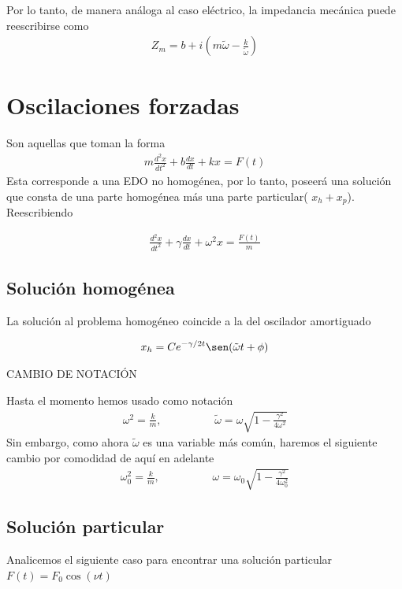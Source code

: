 \documentclass[12pt]{article}
\begin{document}
Por lo tanto, de manera análoga al caso eléctrico, la impedancia mecánica puede reescribirse como 
\begin{align*}
    Z_m = b + i \left( m \tilde{\omega} - \frac{k}{\tilde{\omega}}\right)
\end{align*}


\section{Oscilaciones forzadas}

Son aquellas que toman la forma
\begin{align}
    m\frac{d^{2}x}{dt^{2}} + b\frac{dx}{dt} + k x = F(t) \label{eq: Movimiento forzado}
\end{align} 
Esta corresponde a una EDO no homogénea, por lo tanto, poseerá una solución que consta de una parte homogénea más una parte particular( \(x_h + x_p\)). Reescribiendo 

\begin{align*}
    \frac{d^{2}x}{dt^{2}} + \gamma\frac{dx}{dt} + \omega^{2} x =\frac{F(t)}{m}
\end{align*}
\subsection{Solución homogénea}
 La solución al problema homogéneo coincide a la del oscilador amortiguado

 \begin{align*}
    x_h = C e^{-\gamma/2 t} \sen(\tilde{\omega} t + \phi)
 \end{align*}

{\color{red} CAMBIO DE NOTACIÓN}

Hasta el momento hemos usado como notación 
\begin{align*}
    \omega^{2} = \frac{ k}{m}, \hspace{2cm} \tilde{\omega} = \omega \sqrt{ 1- \frac{\gamma^{2}}{4\omega^{2}}}
\end{align*}
Sin embargo, como ahora \(\tilde{\omega }\) es una variable más común, haremos el siguiente cambio por comodidad de aquí en adelante
\begin{align*}
    \boxed{\omega_0^{2} = \frac{ k}{m}, \hspace{2cm} \omega = \omega_0 \sqrt{ 1- \frac{\gamma^{2}}{4\omega_0^{2}}}}
\end{align*}
\subsection{Solución particular}
Analicemos el siguiente caso para encontrar una solución particular \(F(t) = F_0 \cos(\nu t)\)
\end{document}
